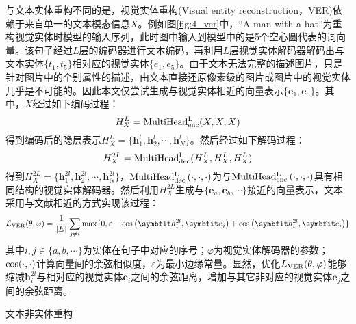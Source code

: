 
与文本实体重构不同的是，视觉实体重构(Visual entity reconstruction，VER)依赖于来自单一的文本模态信息$X$。例如图\ref{fig:4_ver}中，“A man with a hat”为重构视觉实体时模型的输入序列，此时图中输入到模型中的是5个空心圆代表的词向量。该句子经过$L$层的编码器进行文本编码，再利用$L$层视觉实体解码器解码出与文本实体$\{t_1,t_5\}$相对应的视觉实体$\{e_1,e_5\}$。由于文本无法完整的描述图片，只是针对图片中的个别属性的描述，由文本直接还原像素级的图片或图片中的视觉实体几乎是不可能的。因此本文仅尝试生成与视觉实体相近的向量表示$\{{\boldsymbol{e}_1},{\boldsymbol{e}_5}\}$。其中，$X$经过如下编码过程：
\begin{equation}
H_X^L={\rm{MultiHead_{enc}^L}}(X, X, X)
\end{equation}
得到编码后的隐层表示$H_X^L=\{{\boldsymbol{h}_1^l},{\boldsymbol{h}_2^l},\cdots,{\boldsymbol{h}_N^l}\}$。然后经过如下解码过程：
\begin{equation}
H_X^{2L}={\rm{MultiHead_{dec}^L}}(H_X^L, H_X^L, H_X^L)
\end{equation}
得到$H_X^{2L}=\{{\boldsymbol{h}_1^{2l}},{\boldsymbol{h}_2^{2l}},\cdots,{\boldsymbol{h}_N^{2l}}\}$，${\rm MultiHead_{dec}^L}\left( \cdot,\cdot,\cdot \right)$为与${\rm MultiHead_{enc}^L}\left( \cdot,\cdot,\cdot \right)$具有相同结构的视觉实体解码器。然后利用$H_X^{2L}$生成与$\{{\boldsymbol{e}_a},{\boldsymbol{e}_b},\cdots\}$接近的向量表示，文本采用与文献\cite{37_elliott-kadar-2017-imagination}相近的方式实现该过程：
\begin{equation}
\mathcal{L}_{\rm{VER}}(\theta, \varphi)=
    \frac{1}{{\vert}E{\vert}}
    \mathop{\sum}_{j{\neq}i} {\max}\{0, \varepsilon - {\rm{cos}}\left( {\boldsymbol h_i^{2l}}, {\boldsymbol e_j} \right) + {\rm{cos}}\left( {\boldsymbol h_i^{2l}}, {\boldsymbol e_i} \right)\}
\end{equation}
%
其中$i,j{\in}\{a,b,\cdots\}$为实体在句子中对应的序号；$\varphi$为视觉实体解码器的参数；${\rm{cos}}(\cdot,\cdot)$计算向量间的余弦相似度，$\varepsilon$为最小边缘常量。显然，优化$L_{\rm{VER}}(\theta,\varphi)$能够缩减${\boldsymbol{h}_i^{2l}}$与相对应的视觉实体${\boldsymbol{e}_i}$之间的余弦距离，增加与其它非对应的视觉实体${\boldsymbol{e}_j}$之间的余弦距离。

{\sffamily 文本非实体重构}


